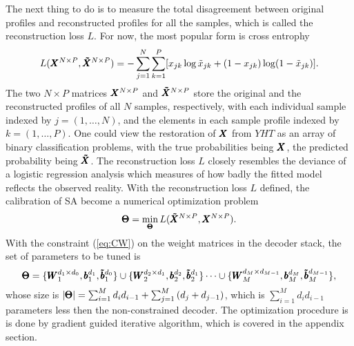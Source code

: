 {The next thing to do is to measure the total disagreement between original profiles and reconstructed profiles for all the samples, which is called the reconstruction loss $L$. For now, the most popular form is cross entrophy
\newcommand{\XECD}{\XEC^{N \times P}}   %
\newcommand{\XDCD}{\XDC^{N \times P}}   %
\newcommand{\YHTD}{\YHT^{N \times P}}   %
\begin{equation} \label{eq:CE}
  L(\XECD, \XDCD) = -\sum_{j=1}^{N}{\sum_{k=1}^P[x_{jk}\log{\tilde{x}_{jk}}+(1-x_{jk})\log(1-\tilde{x}_{jk})]}.
\end{equation}
The two $N \times P$ matrices $\XECD$ and $\XDCD$ store the original and the reconstructed profiles of all $N$ samples, respectively, with each individual sample indexed by $j=(1, \dots, N)$, and the elements in each sample profile indexed by $k = (1, \dots, P)$. One could view the restoration of $\pmb{X}$ from $YHT$ as an array of binary classification problems, with the true probabilities being $\pmb{X}$, the predicted probability being $\pmb{\tilde{X}}$. The reconstruction loss $L$ closely resembles the deviance of a logistic regression analysis which measures of how badly the fitted model reflects the observed reality. With the reconstruction loss $L$ defined, the calibration of SA become a numerical optimization problem
\[ \Par = \min_{\Par} L(\XDCD, \XECD). \]
With the constraint (\ref{eq:CW}) on the weight matrices in the decoder stack, the set of parameters to be tuned is
\[ \pmb{\Theta} = \{\pmb{W}_{1}^{d_{1} \times d_{0}}, \pmb{b}_{1}^{d_{1}}, \pmb{\tilde{b}}_{1}^{d_{0}}\} \cup \{\pmb{W}_{2}^{d_{2} \times d_{1}}, \pmb{b}_{2}^{d_{2}}, \pmb{\tilde{b}}_{2}^{d_{1}}\} \dots \cup \{\pmb{W}_{M}^{d_{M} \times d_{M-1}}, \pmb{b}_{M}^{d_{M}}, \pmb{\tilde{b}}_{M}^{d_{M-1}}\}, \]
whose size is $|\pmb{\Theta}| = \sum_{i=1}^M{d_i d_{i-1}} + \sum_{j=1}^M{(d_j + d_{j-1})}$, which is $\sum_{i=1}^M{d_i d_{i-1}}$ parameters less then the non-constrained decoder. The optimization procedure is is done by gradient guided iterative algorithm, which is covered in the appendix section.

}

